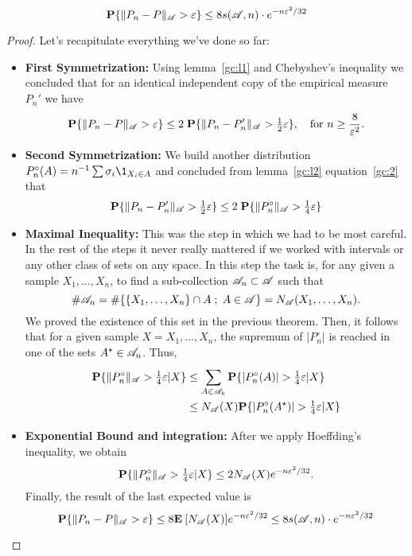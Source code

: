 \begin{theorem}\label{vc:inequality}
 \[\P\{\|P_n-P\|_{\AA} > \varepsilon\} \leq 8 s(\AA, n) \cdot e^{-n \varepsilon^2 / 32} \] 
\end{theorem}
\begin{proof}
    Let's recapitulate everything we've done so far:
    \begin{itemize}
        \item \textbf{First Symmetrization:} Using {lemma}~\ref{gc:l1} and Chebyshev's inequality we concluded that for an identical independent copy of the empirical measure $P_n'$ we have
        \[ \P\{\|P_n - P\|_\AA > \varepsilon\} \leq 2 \; \P\{\|P_n-P_n'\|_\AA > \tfrac{1}{2}\varepsilon\},\hspace*{1em}\text{for } n \geq \frac{8}{\varepsilon^2}.\] 
        \item \textbf{Second Symmetrization:} We build another distribution $P_n^\circ(A) = n^{-1}\sum \sigma_i \1_{X_i \in A} $ and concluded from {lemma}~\ref{gc:l2} equation~\ref{gc:2} that
        \[ \P\{\|P_n-P_n'\|_\AA > \tfrac{1}{2}\varepsilon\} \leq 2\; \P\{\|P_n^\circ\|_\AA > \tfrac{1}{4}\varepsilon\}   \]
        \item \textbf{Maximal Inequality:} This was the step in which we had to be most careful. In the rest of the steps it never really mattered if we worked with intervals or any other class of sets on any space. In this step the task is, for any given a sample $X_1, \ldots, X_n$, to find a sub-collection $\AA_n \subset \AA$ such that
        \[ \#\AA_n = \#\{\{X_1,\ldots,X_n\}\cap A \; ;\; A\in\AA\} = N_\AA(X_1,\ldots, X_n).\] 
        We proved the existence of this set in the previous theorem. Then, it follows that for a given sample $X = X_1,\ldots, X_n$, the supremum of $|P_n^\circ|$ is reached in one of the sets $A^\star \in \AA_n$. Thus,
        \[ \everymath{\displaystyle}\arraycolsep=1.4pt\def\arraystretch{1.5}
        \begin{array}{rcl}
            \P\{\|P_n^\circ\|_\AA > \tfrac{1}{4}\varepsilon | X\} & \leq & \sum_{A\in \AA_k}\P\{|P_n^\circ(A)| > \tfrac{1}{4}\varepsilon | X\} \\
            &\leq& N_\AA(X) \P\{|P_n^\circ(A^\star)| > \tfrac{1}{4}\varepsilon | X\}
       \end{array}
        \]
        \item \textbf{Exponential Bound and integration:} After we apply Hoeffding's inequality, we obtain
        \[ \P\{\|P_n^\circ\|_\AA > \tfrac{1}{4}\varepsilon | X\} \leq 2 N_\AA(X) e^{-n\varepsilon^2/32}.\]
        Finally, the result of the last expected value is 
         \[ \P\{\|P_n-P\|_\AA > \varepsilon\} \leq 8 \E[N_\AA(X)] e^{-n\varepsilon^2/32} \leq 8 s(\AA, n) \cdot e^{-n \varepsilon^2 / 32} \] 
    \end{itemize}
\end{proof}

